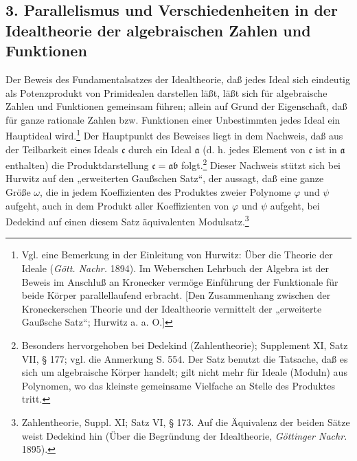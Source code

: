 \documentclass[11pt]{article}
\providecommand{\fra}{\mathfrak a}
\providecommand{\frb}{\mathfrak b}
\providecommand{\frc}{\mathfrak c}
\begin{document}
\subsection*{3. Parallelismus und Verschiedenheiten in der Idealtheorie der algebraischen Zahlen und Funktionen}
Der Beweis des Fundamentalsatzes der Idealtheorie, daß jedes Ideal sich eindeutig als Potenzprodukt von Primidealen darstellen läßt, läßt sich für algebraische Zahlen und Funktionen gemeinsam führen; allein auf Grund der Eigenschaft, daß für ganze rationale Zahlen bzw. Funktionen einer Unbestimmten jedes Ideal ein Hauptideal wird.\footnote{Vgl. eine Bemerkung in der Einleitung von Hurwitz: Über die Theorie der Ideale (\emph{Gött. Nachr.} 1894). Im Weberschen Lehrbuch der Algebra ist der Beweis im Anschluß an Kronecker vermöge Einführung der Funktionale für beide Körper parallellaufend erbracht. [Den Zusammenhang zwischen der Kroneckerschen Theorie und der Idealtheorie vermittelt der „erweiterte Gaußsche Satz“; Hurwitz a. a. O.]} Der Hauptpunkt des Beweises liegt in dem Nachweis, daß aus der Teilbarkeit eines Ideals \(\frc\) durch ein Ideal \(\fra\) (d. h. jedes Element von \(\frc\) ist in \(\fra\) enthalten) die Produktdarstellung \(\frc=\fra\frb\) folgt.\footnote{Besonders hervorgehoben bei Dedekind (Zahlentheorie); Supplement XI, Satz VII, § 177; vgl. die Anmerkung S. 554. Der Satz benutzt die Tatsache, daß es sich um algebraische Körper handelt; gilt nicht mehr für Ideale (Moduln) aus Polynomen, wo das kleinste gemeinsame Vielfache an Stelle des Produktes tritt.} Dieser Nachweis stützt sich bei Hurwitz auf den „erweiterten Gaußschen Satz“, der aussagt, daß eine ganze Größe \(\omega\), die in jedem Koeffizienten des Produktes zweier Polynome \(\varphi\) und \(\psi\) aufgeht, auch in dem Produkt aller Koeffizienten von \(\varphi\) und \(\psi\) aufgeht, bei Dedekind auf einen diesem Satz äquivalenten Modulsatz.\footnote{Zahlentheorie, Suppl. XI; Satz VI, § 173. Auf die Äquivalenz der beiden Sätze weist Dedekind hin (Über die Begründung der Idealtheorie, \emph{Göttinger Nachr.} 1895).}
\end{document}
